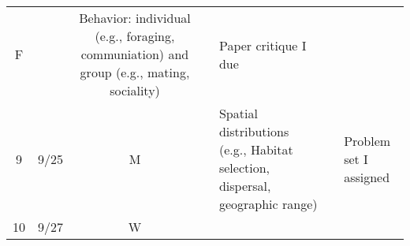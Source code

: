 \documentclass[]{article}
\begin{document}
\begin{longtable}[]{@{}cccllll@{}}
\begin{minipage}[t]{0.07\columnwidth}
F\strut
\end{minipage} & \begin{minipage}[t]{0.10\columnwidth}\raggedright\strut
\strut
\end{minipage} & \begin{minipage}[t]{0.11\columnwidth}\raggedright\strut
Behavior: individual (e.g., foraging, communiation) and group (e.g.,
mating, sociality)\strut
\end{minipage} & \begin{minipage}[t]{0.11\columnwidth}\raggedright\strut
\strut
\end{minipage} & \begin{minipage}[t]{0.16\columnwidth}\raggedright\strut
Paper critique I due\strut
\end{minipage}\tabularnewline
\begin{minipage}[t]{0.12\columnwidth}\centering\strut
9\strut
\end{minipage} & \begin{minipage}[t]{0.08\columnwidth}\centering\strut
9/25\strut
\end{minipage} & \begin{minipage}[t]{0.07\columnwidth}\centering\strut
M\strut
\end{minipage} & \begin{minipage}[t]{0.10\columnwidth}\raggedright\strut
\strut
\end{minipage} & \begin{minipage}[t]{0.11\columnwidth}\raggedright\strut
Spatial distributions (e.g., Habitat selection, dispersal, geographic
range)\strut
\end{minipage} & \begin{minipage}[t]{0.11\columnwidth}\raggedright\strut
\strut
\end{minipage} & \begin{minipage}[t]{0.16\columnwidth}\raggedright\strut
Problem set I assigned\strut
\end{minipage}\tabularnewline
\begin{minipage}[t]{0.12\columnwidth}\centering\strut
10\strut
\end{minipage} & \begin{minipage}[t]{0.08\columnwidth}\centering\strut
9/27\strut
\end{minipage} & \begin{minipage}[t]{0.07\columnwidth}\centering\strut
W\strut
\end{minipage} & \begin{minipage}[t]{0.10\columnwidth}\raggedright\strut

\end{minipage}
\end{longtable}
\end{document}
